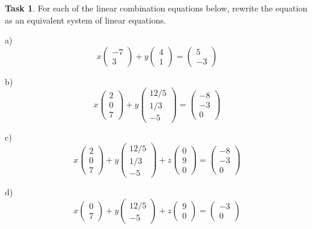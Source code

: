 \documentclass{tufte-book}
\theoremstyle{definition}
\newtheorem{task}{Task}
\begin{document}
\begin{task}
For each of the linear combination equations below, rewrite the equation as an equivalent system of linear equations.
\begin{compactitem}
\item[a)] 
\[
x \begin{pmatrix} -7\\ 3\end{pmatrix} + y \begin{pmatrix} 4\\ 1\end{pmatrix} = \begin{pmatrix} 5\\-3 \end{pmatrix}
\]

\item[b)]
\[
x \begin{pmatrix} 2\\ 0\\ 7\end{pmatrix} + y \begin{pmatrix} 12/5\\ 1/3\\ -5\end{pmatrix} = \begin{pmatrix} -8\\-3 \\ 0\end{pmatrix}
\]

\item[c)]
\[
x \begin{pmatrix} 2\\ 0\\ 7\end{pmatrix} + y \begin{pmatrix} 12/5\\ 1/3\\ -5\end{pmatrix} + z \begin{pmatrix} 0 \\ 9 \\ 0\end{pmatrix} = \begin{pmatrix} -8\\-3 \\ 0\end{pmatrix}
\]

\item[d)]
\[x \begin{pmatrix} 0\\ 7\end{pmatrix} + y \begin{pmatrix} 12/5\\ -5\end{pmatrix} + z \begin{pmatrix} 9 \\ 0\end{pmatrix}= \begin{pmatrix} -3 \\ 0\end{pmatrix}
\]

\end{compactitem}
\end{task}
\end{document}
